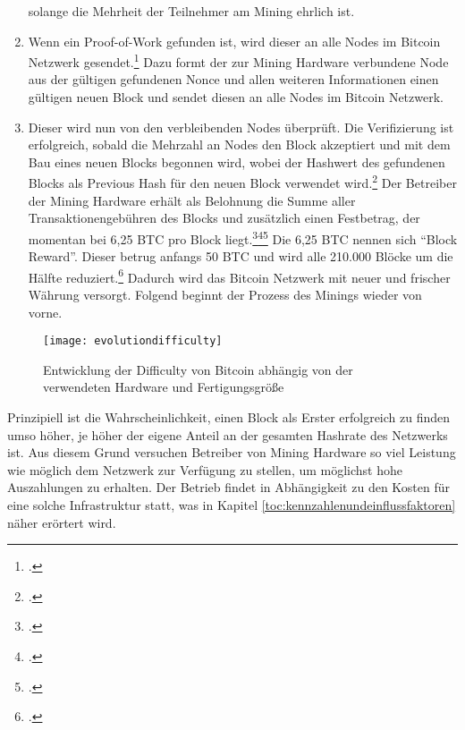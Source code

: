 \begin{enumerate}
    solange die Mehrheit der Teilnehmer am Mining ehrlich ist. 
    \item Wenn ein Proof-of-Work gefunden ist, wird dieser an alle Nodes im Bitcoin Netzwerk
    gesendet.\footcite[Vgl.][S. 3f]{nakamoto2008bitcoin} Dazu formt der zur Mining Hardware verbundene Node aus der
    gültigen gefundenen Nonce und allen weiteren Informationen einen gültigen neuen Block und sendet diesen an alle
    Nodes im Bitcoin Netzwerk.
    \item Dieser wird nun von den verbleibenden Nodes überprüft. Die Verifizierung ist erfolgreich, sobald die Mehrzahl
    an Nodes den Block akzeptiert und mit dem Bau eines neuen Blocks begonnen wird, wobei der Hashwert des gefundenen
    Blocks als Previous Hash für den neuen Block verwendet wird.\footcite[Vgl.][S. 3f]{nakamoto2008bitcoin}
    Der Betreiber der Mining Hardware erhält als Belohnung die Summe aller Transaktionengebühren des Blocks und
    zusätzlich einen Festbetrag, der momentan bei 6,25 \ac{BTC} pro Block
    liegt.\footcite[Vgl.][S. 4]{nakamoto2008bitcoin}\footcite[Vgl.][]{btcecho2021halving}\footcite[Vgl.][S. 59]{taylor2017evolution}
    Die 6,25 \ac{BTC} nennen sich "`Block Reward"'. Dieser betrug anfangs 50 \ac{BTC} und wird alle 210.000 Blöcke um
    die Hälfte reduziert.\footcite[Vgl.][S. 58]{taylor2017evolution} Dadurch wird das Bitcoin Netzwerk mit neuer und
    frischer Währung versorgt. Folgend beginnt der Prozess des Minings wieder von vorne.
\end{enumerate}

\begin{figure}[H]
    \caption{Entwicklung der Difficulty von Bitcoin abhängig von der verwendeten Hardware und Fertigungsgröße}
    \texttt{[image: evolutiondifficulty]}
    \label{figure:evolutiondifficulty}
    \\
    \cite[Quelle: ][Abb. 1b]{taylor2017evolution}
\end{figure}

Prinzipiell ist die Wahrscheinlichkeit, einen Block als Erster erfolgreich zu finden umso höher, je höher der eigene
Anteil an der gesamten Hashrate des Netzwerks ist. Aus diesem Grund versuchen Betreiber von Mining Hardware so viel
Leistung wie möglich dem Netzwerk zur Verfügung zu stellen, um möglichst hohe Auszahlungen zu erhalten. Der Betrieb
findet in Abhängigkeit zu den Kosten für eine solche Infrastruktur statt, was in Kapitel
\ref{toc:kennzahlenundeinflussfaktoren} näher erörtert wird.

